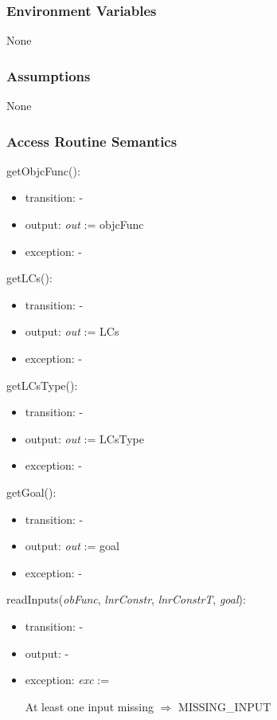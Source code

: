 \documentclass[12pt, titlepage]{article}
\begin{document}
\subsubsection{Environment Variables}

None

\subsubsection{Assumptions}

None

\subsubsection{Access Routine Semantics}

\noindent 
getObjcFunc():
\begin{itemize}
	\item transition: -
	\item output: \textit{out} := objcFunc
	\item exception: -
\end{itemize}

\noindent 
getLCs():
\begin{itemize}
	\item transition: -
	\item output: \textit{out} := LCs
	\item exception: -
\end{itemize}

\noindent 
getLCsType():
\begin{itemize}
	\item transition: -
	\item output: \textit{out} := LCsType
	\item exception: -
\end{itemize}

\noindent 
getGoal():
\begin{itemize}
	\item transition: -
	\item output: \textit{out} := goal
	\item exception: -
\end{itemize}

\noindent 
readInputs(\textit{obFunc}, \textit{lnrConstr}, \textit{lnrConstrT}, 
\textit{goal}):
\begin{itemize}
	\item transition: -
	\item output: -
	\item exception: \textit{exc} := 
	
	At least one input missing \hspace{3.5cm} $\Rightarrow$ MISSING{\_}INPUT
\end{itemize}
\end{document}
